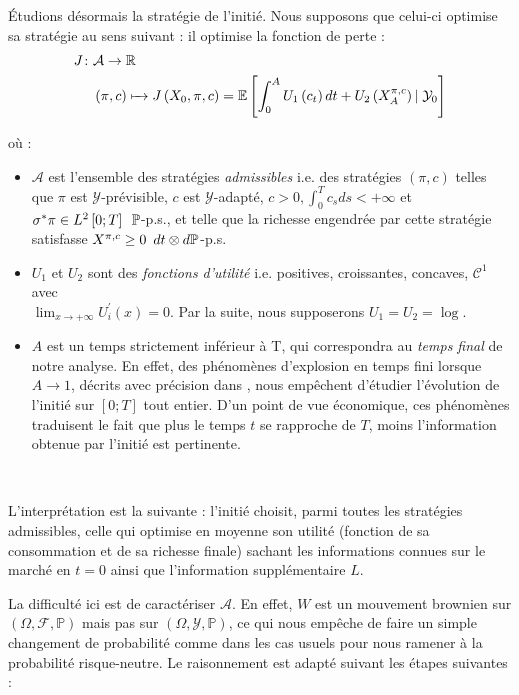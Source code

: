 \documentclass[../finalreport.tex]{subfiles}
\begin{document}
\par Étudions désormais la stratégie de l'initié. Nous supposons que celui-ci optimise sa stratégie au sens suivant : il optimise la fonction de perte :
\begin{align*}
      J \colon &\mathcal{A} \to \mathbb{R} \\
       &\left( \pi, c \right) \xmapsto{\phantom{\mathcal{A}}} J \left( X_0, \pi, c \right) = \mathbb{E} \left[ \int_0^A U_1 \left( c_t \right) dt + U_2 \left( X_A^{\pi, c} \right) \left\vert\right. \mathcal{Y}_0 \right]
\end{align*}

où : 
\begin{itemize}
\item $\mathcal{A}$ est l'ensemble des stratégies \emph{admissibles} i.e. des stratégies $\left( \pi, c \right)$ telles que $\pi$ est $\mathcal{Y}$-prévisible, $c$ est $\mathcal{Y}$-adapté, $c >0, \int_0^T c_s ds < + \infty$ et $\sigma^* \pi \in L^2 \left[ 0; T \right] \enskip \mathbb{P}$-p.s., et telle que la richesse engendrée par cette stratégie satisfasse $X^{\pi, c} \geq 0 \enskip dt \otimes d \mathbb{P}$-p.s.
\item $U_1$ et $U_2$ sont des \emph{fonctions d'utilité} i.e. positives, croissantes, concaves, $\mathcal{C}^1$ avec \\ $\lim_{x \to +\infty} U_i^{'} \left( x \right) = 0$. Par la suite, nous supposerons $U_1 = U_2 = \log$.
\item $A$ est un temps strictement inférieur à T, qui correspondra au \emph{temps final} de notre analyse. En effet, des phénomènes d'explosion en temps fini lorsque $A \to 1$, décrits avec précision dans \cite{art3}, nous empêchent d'étudier l'évolution de l'initié sur $\left[ 0; T \right]$ tout entier. D'un point de vue économique, ces phénomènes traduisent le fait que plus le temps $t$ se rapproche de $T$, moins l'information obtenue par l'initié est pertinente.
\end{itemize}
\

\par L'interprétation est la suivante : l'initié choisit, parmi toutes les stratégies admissibles, celle qui optimise en moyenne son utilité (fonction de sa consommation et de sa richesse finale) sachant les informations connues sur le marché en $t = 0$ ainsi que l'information supplémentaire $L$.\\

\par La difficulté ici est de caractériser $\mathcal{A}$. En effet, $W$ est un mouvement brownien sur $\left(\Omega, \mathcal{F}, \mathbb{P} \right) $ mais pas sur $\left(\Omega, \mathcal{Y}, \mathbb{P} \right)$, ce qui nous empêche de faire un simple changement de probabilité comme dans les cas usuels pour nous ramener à la probabilité risque-neutre. Le raisonnement est adapté suivant les étapes suivantes :
\end{document}
